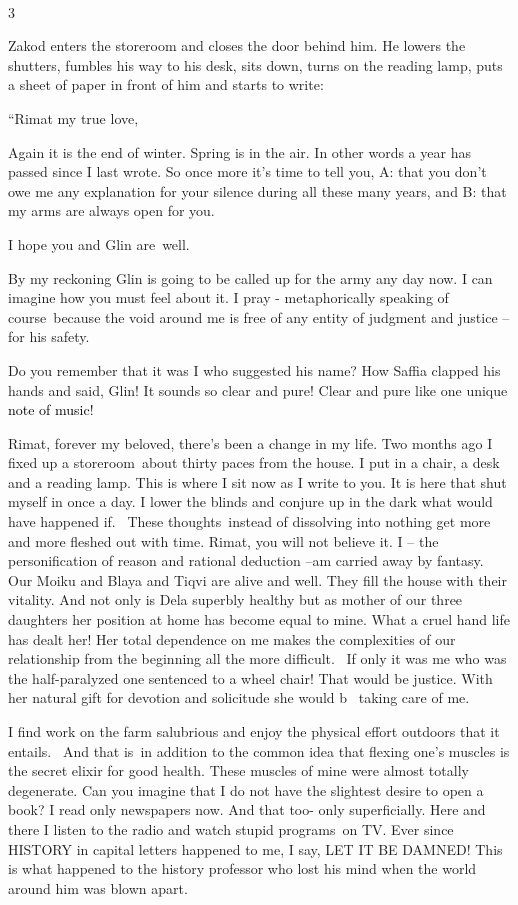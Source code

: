 \documentclass[letterpaper]{article}
\begin{document}
~

3 

Zakod enters the storeroom and closes the door behind him. He lowers the shutters, fumbles his way to his desk, sits
down, turns on the reading lamp, puts a sheet of paper in front of him and starts to write:

{}``Rimat my true love,

Again it is the end of winter. Spring is in the air. In other words a year has passed since I last wrote. So once more
it's time to tell you, A: that you don't owe me any explanation for your silence during all these many years, and B:
that my arms are always open for you.

I hope you and Glin are~well.

By my reckoning Glin is going to be called up for the army any day now. I can imagine how you must feel about it. I pray
- metaphorically speaking of course~because the void around me is free of any entity of judgment and justice -- for his
safety.

Do you remember that it was I who suggested his name? How Saffia clapped his hands and said, {\textquotedbl}Glin! It
sounds so clear and pure! Clear and pure like one unique \textcolor{black}{note of music}!{\textquotedbl}

Rimat, forever my beloved, there's been a change in my life. Two months ago I fixed up a storeroom~about thirty paces
from the house. I put in a chair, a desk and a reading lamp. This is where I sit now as I write to you. It is here that
shut myself in once a day. I lower the blinds and conjure up in the dark what would have happened
{\textquotedbl}if{\textquotedbl}.~ These thoughts~instead of dissolving into nothing get more and more fleshed out with
time. Rimat, you will not believe it. I -- the personification of reason and rational deduction --am carried away by
fantasy.~ Our Moiku and Blaya and Tiqvi are alive and well. They fill the house with their vitality. And not only is
Dela superbly healthy but as mother of our three daughters her position at home has become equal to mine. What a cruel
hand life has dealt her! Her total dependence on me makes the complexities of our relationship from the beginning all
the more difficult. \ If only it was me who was the half-paralyzed one sentenced to a wheel chair! That would be
justice. With her natural gift for devotion and solicitude she would b \ taking care of me.~ 

I find work on the farm salubrious and enjoy the physical effort outdoors that it entails.~ And that is~in addition to
the common idea that flexing one's muscles is the secret elixir for good health. These muscles of mine were almost
totally degenerate. Can you imagine that I do not have the slightest desire to open a book? I read only newspapers now.
And that too- only superficially. Here and there I listen to the radio and watch stupid programs~on TV. Ever since
HISTORY in capital letters happened to me, I say, LET IT BE DAMNED! This is what happened to the history professor who
lost his mind when the world around him was blown apart.
\end{document}
